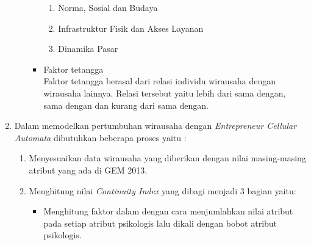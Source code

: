 \begin{enumerate}
\begin{itemize}
\begin{itemize}
\begin{enumerate}
				\item Norma, Sosial dan Budaya
				\item Infrastruktur Fisik dan Akses Layanan
				\item Dinamika Pasar
			\end{enumerate}
			\item Faktor tetangga\\
			Faktor tetangga berasal dari relasi individu wirausaha dengan wirausaha lainnya. Relasi tersebut yaitu lebih dari sama dengan, sama dengan dan kurang dari sama dengan. 
		\end{itemize}
	\end{itemize}
	\item Dalam memodelkan pertumbuhan wirausaha dengan \textit{Entrepreneur Cellular Automata} dibutuhkan beberapa proses yaitu :\\
	\begin{enumerate}
		\item Menyesuaikan data wirausaha yang diberikan dengan nilai masing-masing atribut yang ada di GEM 2013.
		\item Menghitung nilai \textit{Continuity Index} yang dibagi menjadi 3 bagian yaitu:\\
		\begin{itemize}
			\item Menghitung faktor dalam dengan cara menjumlahkan nilai atribut pada setiap atribut psikologis lalu dikali dengan bobot atribut psikologis.
		\end{itemize}
	\end{enumerate}
\end{enumerate}